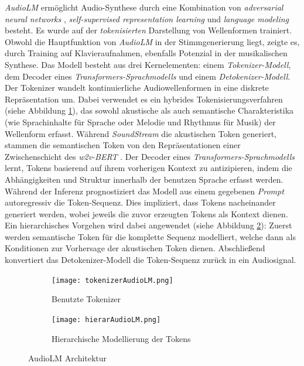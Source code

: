 \documentclass[
  a4paper,  %
  twoside,  %
  bibliography=totoc,
  headsepline,
  cleardoublepage=empty,
  parskip=half,
  draft=false
]{scrbook}
\begin{document}
\emph{AudioLM} \cite{borsos_audiolm_2022} ermöglicht Audio-Synthese durch eine Kombination von \emph{adversarial neural networks} \cite{goodfellow_generative_2014}, \emph{self-supervised representation learning} \cite{chung_w2v-bert_2021} und \emph{language modeling} \cite{roberts_scaling_2022} besteht. Es wurde auf der \emph{tokenisierten} Darstellung von Wellenformen trainiert. Obwohl die Hauptfunktion von \emph{AudioLM} in der Stimmgenerierung liegt, zeigte es, durch Training auf Klavieraufnahmen, ebenfalls Potenzial in der musikalischen Synthese.  Das Modell besteht aus drei Kernelementen: einem \emph{Tokenizer-Modell}, dem Decoder eines \emph{Transformers-Sprachmodells} und einem \emph{Detokenizer-Modell}. Der Tokenizer wandelt kontinuierliche Audiowellenformen in eine diskrete Repräsentation um. Dabei verwendet es ein hybrides Tokenisierungsverfahren (siehe Abbildung \ref{fig:tokenizerAudioLM}), das sowohl akustische als auch semantische Charakteristika (wie Sprachinhalte für Sprache oder Melodie und Rhythmus für Musik) der Wellenform erfasst. Während \emph{SoundStream} \cite{zeghidour_soundstream_2021} die akustischen Token generiert, stammen die semantischen Token von den Repräsentationen einer Zwischenschicht des \emph{w2v-BERT} \cite{chung_w2v-bert_2021}. Der Decoder eines \emph{Transformers-Sprachmodells}\cite{vaswani_attention_2017} lernt, Tokens basierend auf ihrem vorherigen Kontext zu antizipieren, indem die Abhängigkeiten und Struktur innerhalb der benutzen Sprache erfasst werden. Während der Inferenz prognostiziert das Modell aus einem gegebenen \emph{Prompt} autoregressiv die Token-Sequenz. Dies impliziert, dass Tokens nacheinander generiert werden, wobei jeweils die zuvor erzeugten Tokens als Kontext dienen. Ein hierarchisches Vorgehen wird dabei angewendet (siehe Abbildung \ref{fig:hierarAudioLM}): Zuerst werden semantische Token für die komplette Sequenz modelliert, welche dann als Konditionen zur Vorhersage der akustischen Token dienen. Abschließend konvertiert das Detokenizer-Modell die Token-Sequenz zurück in ein Audiosignal. \cite{borsos_audiolm_2022}

\begin{figure}[h]
\centering
\begin{subfigure}{1.0\textwidth}
  \centering
  \texttt{[image: tokenizerAudioLM.png]}
  \caption[AudioLM Tokenisierungsverfahren]{Benutzte Tokenizer}
  \label{fig:tokenizerAudioLM}
\end{subfigure}

\vspace{1em} %

\begin{subfigure}{1.0\textwidth}
  \centering
  \texttt{[image: hierarAudioLM.png]}
  \caption[AudioLM Hierarchische Modellierung der Tokens]{Hierarchische Modellierung der Tokens}
  \label{fig:hierarAudioLM}
\end{subfigure}
\caption[AudioLM Architektur]{AudioLM Architektur \cite{borsos_audiolm_2022}}
\label{fig:test}
\end{figure}
\end{document}
